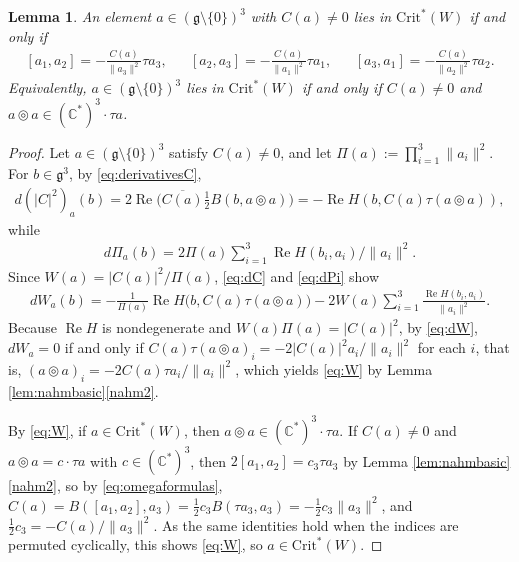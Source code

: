 \documentclass [leqno, 10pt]{amsart}
\newtheorem{lemma}[theorem]{Lemma}%
\theoremstyle{definition}
\numberwithin{equation}{section}
\newcommand{\tmlt}{\circledcirc}
\newcommand{\re}{\operatorname{Re}}
\newcommand{\g}{\mathfrak{g}}
\newcommand{\com}{\mathbb C}
\newcommand{\crtnt}{\mathrm{Crit}^*}
\newcommand{\norm}[1]{\lVert #1\rVert}
\begin{document}
\begin{lemma}\label{lem:critW}
An element $a \in (\g \setminus\{0\})^{3}$ with $C(a) \neq 0$ lies in $\crtnt(W)$ if and only if
\begin{align}\label{eq:W}
&[a_{1}, a_{2}] = -\frac{C(a)}{\norm{a_{3}}^{2}}\tau a_{3},&
&[a_{2}, a_{3}] = -\frac{C(a)}{\norm{a_{1}}^{2}}\tau a_{1},&
&[a_{3}, a_{1}] = -\frac{C(a)}{\norm{a_{2}}^{2}}\tau a_{2}.&
\end{align}
Equivalently, $a \in (\g \setminus\{0\})^{3}$ lies in $\crtnt(W)$ if and only if $C(a) \neq 0$ and $a \tmlt a \in (\com^{\ast})^{3}\cdot \tau a$.
\end{lemma}
\begin{proof}
Let $a \in (\g\setminus\{0\})^{3}$ satisfy $C(a) \neq 0$, and let $\Pi(a) := \prod_{i=1}^{3}\norm{a_{i}}^{2}$. For $b \in \g^{3}$, by \eqref{eq:derivativesC}, 
\begin{align}\label{eq:dC}
d(|C|^{2})_{a}(b) = 2\re\big(\overline{C(a)}\tfrac{1}{2}B(b, a \tmlt a)\big) = -\re H(b, C(a)\tau(a \tmlt a)),
\end{align}
while 
\begin{align}\label{eq:dPi}
d\Pi_{a}(b) = 2\Pi(a)\sum_{i=1}^{3}\re H(b_{i}, a_{i})/\norm{a_{i}}^{2}. 
\end{align}
Since $W(a) = |C(a)|^{2}/\Pi(a)$, \eqref{eq:dC} and \eqref{eq:dPi} show 
\begin{align}\label{eq:dW}
dW_{a}(b) = -\frac{1}{\Pi(a)}\re H\big(b, C(a)\tau(a \tmlt a)\big) - 2W(a)\sum_{i=1}^{3}\frac{\re H(b_{i}, a_{i})}{\norm{a_{i}}^{2}}.
\end{align}
Because $\re H$ is nondegenerate and $W(a)\Pi(a) = |C(a)|^{2}$, by \eqref{eq:dW}, $dW_{a} = 0$ if and only if $C(a)\tau(a \tmlt a)_{i} = -2|C(a)|^{2}a_{i}/\norm{a_{i}}^{2}$ for each $i$, that is, $(a \tmlt a)_{i} = -2C(a)\tau a_{i}/\norm{a_{i}}^{2}$, which yields \eqref{eq:W} by Lemma \ref{lem:nahmbasic}\ref{nahm2}.

By \eqref{eq:W}, if $a \in \crtnt(W)$, then $a \tmlt a \in (\com^{\ast})^{3}\cdot \tau a$. If $C(a) \neq 0$ and $a \tmlt a = c \cdot \tau a$ with $c \in (\com^{\ast})^{3}$, then $2[a_{1}, a_{2}] = c_{3}\tau a_{3}$ by Lemma \ref{lem:nahmbasic}\ref{nahm2}, so by \eqref{eq:omegaformulas}, $C(a) = B([a_{1}, a_{2}], a_{3}) = \tfrac{1}{2}c_{3}B(\tau a_{3}, a_{3}) = -\tfrac{1}{2}c_{3}\norm{a_{3}}^{2}$, and $\tfrac{1}{2}c_{3} = -C(a)/\norm{a_{3}}^{2}$. As the same identities hold when the indices are permuted cyclically, this shows \eqref{eq:W}, so $a \in \crtnt(W)$.
\end{proof}
\end{document}
